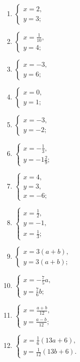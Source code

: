 \begin{enumerate}[start=1]
\item
  \(\left\{ \begin{array}{l} x = 2, \\ y = 3; \end{array} \right.\)
\item
  \(\left\{ \begin{array}{l} x = \frac{1}{10}, \\ y = 4; \end{array} \right.\)
\item
  \(\left\{ \begin{array}{l} x = -3, \\ y = 6; \end{array} \right.\)
\item
  \(\left\{ \begin{array}{l} x = 0, \\ y = 1; \end{array} \right.\)
\item
  \(\left\{ \begin{array}{l} x = -3, \\ y = -2; \end{array} \right.\)
\item
  \(\left\{ \begin{array}{l} x = -\frac{1}{3}, \\ y = -1\frac{2}{9}; \end{array} \right.\)
\item
  \(\left\{ \begin{array}{l} x = 4, \\ y = 3, \\ x = -6; \end{array} \right.\)
\item
  \(\left\{ \begin{array}{l} x = \frac{1}{2}, \\ y = -1, \\ x = \frac{1}{3}; \end{array} \right.\)
\item
  \(\left\{ \begin{array}{l} x = 3(a + b), \\ y = 3(a + b); \end{array} \right.\)
\item
  \(\left\{ \begin{array}{l} x = -\frac{7}{5}a, \\ y = \frac{7}{6}b; \end{array} \right.\)
\item
  \(\left\{ \begin{array}{l} x = \frac{a + b}{12}, \\ y = \frac{a - b}{12}; \end{array} \right.\)
\item
  \(\left\{ \begin{array}{l} x = \frac{1}{6}(13a + 6), \\ y = \frac{1}{12}(13b + 6). \end{array} \right.\)
\end{enumerate}

